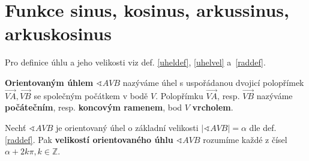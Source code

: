 \section{Funkce sinus, kosinus, arkussinus, arkuskosinus}

\begin{pozn}
  Pro definice úhlu a jeho velikosti viz def. \ref{uheldef}, \ref{uhelvel} a~\ref{raddef}.
\end{pozn}

\begin{definition}
    \textbf{Orientovaným úhlem} $\sphericalangle AVB$ nazýváme úhel s uspořádanou dvojicí
    polopřímek $\overrightarrow{VA}, \overrightarrow{VB}$ se společným počátkem v bodě $V.$
    Polopřímku $\overrightarrow{VA}$, resp. $\overrightarrow{VB}$ nazýváme \textbf{počátečním},
    resp. \textbf{koncovým ramenem}, bod $V$ \textbf{vrcholem}.
\end{definition}

\begin{definition}
    Nechť $\sphericalangle AVB$ je orientovaný úhel o základní velikosti $|\sphericalangle AVB| = \alpha$ dle def. \ref{raddef}. Pak
    \textbf{velikostí orientovaného úhlu} $\sphericalangle AVB$ rozumíme každé z
    čísel $\alpha +2k\pi, k \in \mathbb Z.$
\end{definition}


